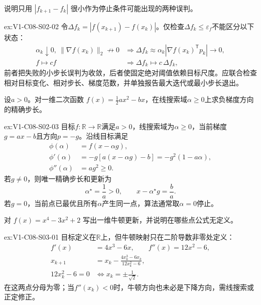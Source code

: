 \begin{SLChapterExercisePairSection}
\begin{exercise}\label{ex:V1-C08-S02-02}
说明只用 $|f_{k+1}-f_k|$ 很小作为停止条件可能出现的两种误判。
\end{exercise}
\label{sol:V1-C08-S02-02}
\begin{chapterexercisesolution}{ex:V1-C08-S02-02}
令$\Delta f_k=|f(x_{k+1})-f(x_k)|$。仅检查$\Delta f_k\le\varepsilon_f$不能区分以下状态：
\[
\begin{aligned}
\alpha_k\downarrow0,\ \|\nabla f(x_k)\|_2\not\to0
&\Longrightarrow \Delta f_k\approx
\alpha_k|\nabla f(x_k)^{\mathsf T}p_k|\to0,\\
f\mapsto c f
&\Longrightarrow \Delta f_k\mapsto c\,\Delta f_k,
\end{aligned}
\]
前者把失败的小步长误判为收敛，后者使固定绝对阈值依赖目标尺度。应联合检查相对目标变化、相对步长、梯度范数，并单独报告最大迭代或最小步长退出。
\end{chapterexercisesolution}

\begin{exercise}\label{ex:V1-C08-S02-03}
设$a>0$。对一维二次函数 $f(x)=\tfrac12ax^2-bx$，在线搜索域$\alpha\ge0$上求负梯度方向的精确步长。
\end{exercise}
\label{sol:V1-C08-S02-03}
\begin{chapterexercisesolution}{ex:V1-C08-S02-03}
目标$f:\mathbb R\to\mathbb R$满足$a>0$，线搜索域为$\alpha\ge0$，当前梯度$g=ax-b$且方向$p=-g$。沿线目标满足
\[
\begin{aligned}
\phi(\alpha)&=f(x-\alpha g),\\
\phi'(\alpha)&=-g[a(x-\alpha g)-b]
=-g^2(1-a\alpha),\\
\phi''(\alpha)&=a g^2\ge0.
\end{aligned}
\]
若$g\ne0$，则唯一精确步长和更新为
\[
\alpha^\star=\frac1a>0,\qquad
x-\alpha^\star g=\frac ba.
\]
若$g=0$，当前点已最优且所有$\alpha$产生同一点，算法通常取$\alpha=0$停止。
\end{chapterexercisesolution}

\begin{exercise}\label{ex:V1-C08-S03-01}
对 $f(x)=x^4-3x^2+2$ 写出一维牛顿更新，并说明在哪些点公式无定义。
\end{exercise}
\label{sol:V1-C08-S03-01}
\begin{chapterexercisesolution}{ex:V1-C08-S03-01}
目标定义在$\mathbb R$上，但牛顿映射只在二阶导数非零处定义：
\[
\begin{aligned}
f'(x)&=4x^3-6x,\qquad
f''(x)=12x^2-6,\\
x_{k+1}
&=x_k-\frac{4x_k^3-6x_k}{12x_k^2-6},\\
12x_k^2-6=0
&\Longleftrightarrow x_k=\pm\frac1{\sqrt2}.
\end{aligned}
\]
在这两点分母为零；当$f''(x_k)<0$时，牛顿方向也未必是下降方向，需线搜索或正定修正。
\end{chapterexercisesolution}


\end{SLChapterExercisePairSection}

